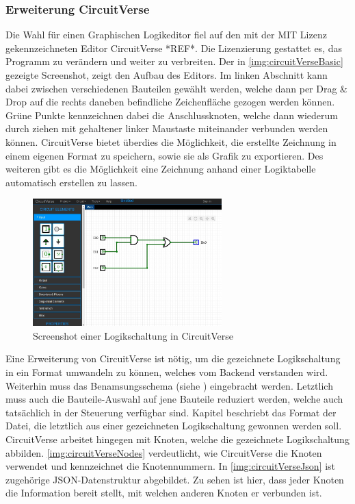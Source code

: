 \subsubsection{Erweiterung CircuitVerse}
Die Wahl für einen Graphischen Logikeditor fiel auf den mit der MIT Lizenz gekennzeichneten Editor CircuitVerse *REF*. Die Lizenzierung gestattet es, das Programm zu verändern und weiter zu verbreiten. Der in \autoref{img:circuitVerseBasic} gezeigte Screenshot, zeigt den Aufbau des Editors. Im linken Abschnitt kann dabei zwischen verschiedenen Bauteilen gewählt werden, welche dann per Drag \& Drop auf die rechts daneben befindliche Zeichenfläche gezogen werden können. Grüne Punkte kennzeichnen dabei die Anschlussknoten, welche dann wiederum durch ziehen mit gehaltener linker Maustaste miteinander verbunden werden können. CircuitVerse bietet überdies die Möglichkeit, die erstellte Zeichnung in einem eigenen Format zu  speichern, sowie sie als Grafik zu exportieren. Des weiteren gibt es die Möglichkeit eine Zeichnung anhand einer Logiktabelle automatisch erstellen zu lassen. 

\begin{figure}[H]
	\begin{center}
		\includegraphics[width=0.65\textwidth ,clip]{./images/circuitverse.jpg}
		\caption{Screenshot einer Logikschaltung in CircuitVerse}
		\label{img:circuitVerseBasic}
	\end{center} 
\end{figure}	

 Eine Erweiterung von CircuitVerse ist nötig, um die gezeichnete Logikschaltung in ein Format umwandeln zu können, welches vom Backend verstanden wird. Weiterhin muss das Benamsungsschema (siehe ) eingebracht werden. Letztlich muss auch die Bauteile-Auswahl auf jene Bauteile reduziert werden, welche auch tatsächlich in der Steuerung verfügbar sind. Kapitel  beschriebt das Format der Datei, die letztlich aus einer gezeichneten Logikschaltung gewonnen werden soll. CircuitVerse arbeitet hingegen mit Knoten, welche die gezeichnete Logikschaltung abbilden. \autoref{img:circuitVerseNodes} verdeutlicht, wie CircuitVerse die Knoten verwendet und kennzeichnet die Knotennummern. In \ref{img:circuitVerseJson} ist zugehörige JSON-Datenstruktur abgebildet. Zu sehen ist hier, dass jeder Knoten die Information bereit stellt, mit welchen anderen Knoten er verbunden ist. 
 

